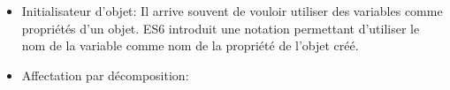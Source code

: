 \begin{itemize}
\begin{Shaded}
\begin{Highlighting}[]
  \OperatorTok{=} \OperatorTok{,} \OperatorTok{=} \NormalTok{) }\OperatorTok{\{}
     \OperatorTok{+} 
\OperatorTok{\}}
  \OperatorTok{,} \OperatorTok{\{}
     \OperatorTok{===} \NormalTok{)}
        \OperatorTok{=} \OperatorTok{;}
     \OperatorTok{===} \NormalTok{)}
        \OperatorTok{=} \OperatorTok{;}
     \OperatorTok{+} \OperatorTok{;}
\OperatorTok{\};}
\end{Highlighting}
\end{Shaded}
\item
  Initialisateur d'objet: Il arrive souvent de vouloir utiliser des
  variables comme propriétés d'un objet. ES6 introduit une notation
  permettant d'utiliser le nom de la variable comme nom de la propriété
  de l'objet créé.

\begin{Shaded}
\begin{Highlighting}[]
\OperatorTok{=} \OperatorTok{\{} \OperatorTok{,} \OperatorTok{\}}
\OperatorTok{=} \OperatorTok{\{} \OperatorTok{:} \OperatorTok{,} \OperatorTok{:} \OperatorTok{\};}
\end{Highlighting}
\end{Shaded}
\item
  Affectation par décomposition:

\begin{Shaded}
\begin{Highlighting}[]
 \OperatorTok{\{} \OperatorTok{,} \OperatorTok{,} \OperatorTok{\}} \OperatorTok{=} \NormalTok{()}

 \OperatorTok{=} \NormalTok{()}\OperatorTok{;}
 \OperatorTok{=} \OperatorTok{;}
 \OperatorTok{=} \OperatorTok{;}
 \OperatorTok{=} \OperatorTok{;}
\end{Highlighting}
\end{Shaded}
\end{itemize}

